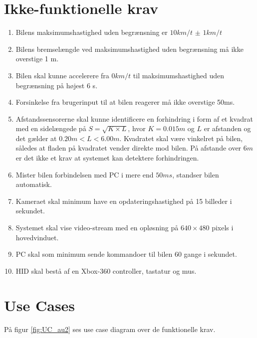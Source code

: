 \section{Ikke-funktionelle krav} \label{sec:ikke-funktionelle_krav}
\begin{enumerate}\itemsep1pt \parskip0pt 
	\item Bilens maksimumshastighed uden begrænsning er $10km/t$ $\pm$ $1km/t$
	\item Bilens bremselængde ved maksimumshastighed uden begrænsning må ikke overstige 1 m.
	\item Bilen skal kunne accelerere fra $0 km/t$ til maksimumshastighed uden begrænsning på højest 6 s.
	\item Forsinkelse fra brugerinput til at bilen reagerer må ikke overstige 50ms.
	\item Afstandssensorerne skal kunne identificere en forhindring i form af et kvadrat med en sidelængede på $S = \sqrt{K \times L}$, hvor $K = 0.015m$ og $L$ er afstanden og det gælder at $0.20m<L<6.00m$. Kvadratet skal være vinkelret på bilen, således at fladen på kvadratet vender direkte mod bilen. På afstande over $6 m$ er det ikke et krav at systemet kan detektere forhindringen.
	\item Mister bilen forbindelsen med PC i mere end $50ms$, standser bilen automatisk. 
	\item Kameraet skal minimum have en opdateringshastighed på 15 billeder i sekundet.
	\item Systemet skal vise video-stream med en opløsning på $640 \times 480$ pixels i hovedvinduet.
	\item PC skal som minimum sende kommandoer til bilen 60 gange i sekundet. 
	\item HID skal bestå af en Xbox-360 controller, tastatur og mus.
\end{enumerate}
\clearpage

\section{Use Cases}
På figur \ref{fig:UC_au2} ses use case diagram over de funktionelle krav. 

